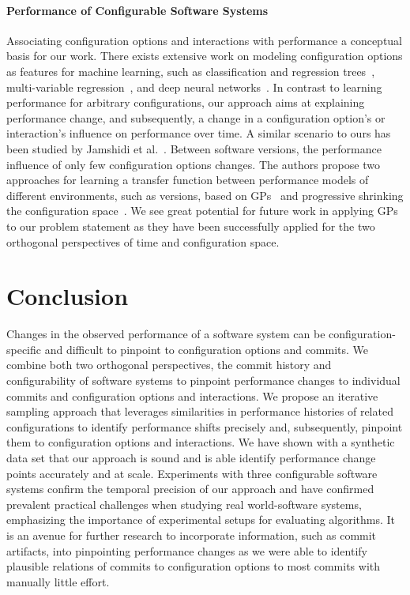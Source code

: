 \documentclass[sigconf]{acmart}
\begin{document}
	\paragraph{Performance of Configurable Software Systems} Associating configuration options and interactions with performance a conceptual basis for our work. There exists extensive work on modeling configuration options as features for machine learning, such as classification and regression trees~\cite{guoVariabilityawarePerformancePrediction2013,sarkarCostEfficientSamplingPerformance,nairUsingBadLearners2017}, multi-variable regression~\cite{siegmundPerformanceinfluenceModelsHighly2015}, and deep neural networks~\cite{haDeepPerf2019}. In contrast to learning performance for arbitrary configurations, our approach aims at explaining performance change, and subsequently, a change in a configuration option's or interaction's influence on performance over time. A similar scenario to ours has been studied by Jamshidi et al.~\cite{jamishidi_transfer_2017,jamshidi_transfer_gp_2017,jamshidi_learning_2018}. Between software versions, the performance influence of only few configuration options changes. The authors propose two approaches for learning a transfer function between performance models of different environments, such as versions, based on GPs~\cite{jamshidi_transfer_gp_2017} and progressive shrinking the configuration space~\cite{jamshidi_learning_2018}. We see great potential for future work in applying GPs to our problem statement as they have been successfully applied for the two orthogonal perspectives of time and configuration space.
	
	\section{Conclusion}
	Changes in the observed performance of a software system can be configuration-specific and difficult to pinpoint to configuration options and commits. We combine both two orthogonal perspectives, the commit history and configurability of software systems to pinpoint performance changes to individual commits and configuration options and interactions. 
	We propose an iterative sampling approach that leverages similarities in performance histories of related configurations to identify performance shifts precisely and, subsequently, pinpoint them to configuration options and interactions. 
	We have shown with a synthetic data set that our approach is sound and is able identify performance change points accurately and at scale. Experiments with three configurable software systems confirm the temporal precision of our approach and have confirmed prevalent practical challenges when studying real world-software systems, emphasizing the importance of experimental setups for evaluating algorithms. It is an avenue for further research to incorporate information, such as commit artifacts, into pinpointing performance changes as we were able to identify plausible relations of commits to configuration options to most commits with manually little effort.
	
\end{document}

